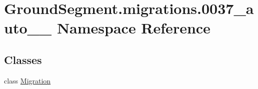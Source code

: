 \hypertarget{namespace_ground_segment_1_1migrations_1_10037__auto__20170131__1727}{}\section{Ground\+Segment.\+migrations.0037\+\_\+auto\+\_\+\_ Namespace Reference}
\label{namespace_ground_segment_1_1migrations_1_10037__auto__20170131__1727}
\subsection*{Classes}
\begin{DoxyCompactItemize}
\item 
class \hyperlink{class_ground_segment_1_1migrations_1_10037__auto__20170131__1727_1_1_migration}{Migration}
\end{DoxyCompactItemize}
